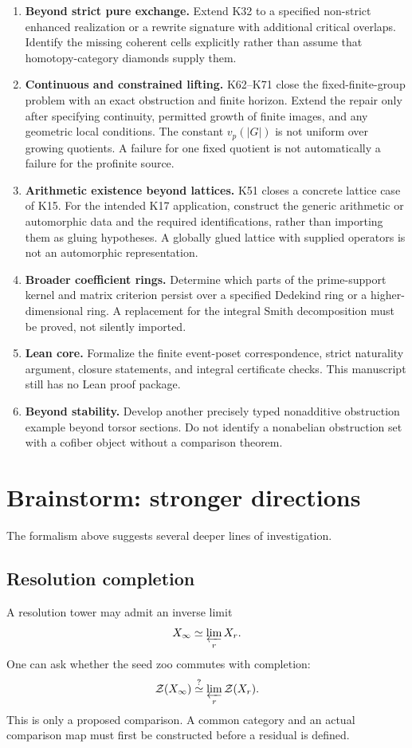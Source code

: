 \documentclass[11pt]{article}
\theoremstyle{definition}
\theoremstyle{remark}
\newcommand{\Zoo}{\mathcal Z}
\begin{document}
\begin{enumerate}
\item \textbf{Beyond strict pure exchange.} Extend K32 to a specified non-strict enhanced realization or a rewrite signature with additional critical overlaps. Identify the missing coherent cells explicitly rather than assume that homotopy-category diamonds supply them.
\item \textbf{Continuous and constrained lifting.} K62--K71 close the fixed-finite-group problem with an exact obstruction and finite horizon. Extend the repair only after specifying continuity, permitted growth of finite images, and any geometric local conditions. The constant $v_p(|G|)$ is not uniform over growing quotients. A failure for one fixed quotient is not automatically a failure for the profinite source.
\item \textbf{Arithmetic existence beyond lattices.} K51 closes a concrete lattice case of K15. For the intended K17 application, construct the generic arithmetic or automorphic data and the required identifications, rather than importing them as gluing hypotheses. A globally glued lattice with supplied operators is not an automorphic representation.
\item \textbf{Broader coefficient rings.} Determine which parts of the prime-support kernel and matrix criterion persist over a specified Dedekind ring or a higher-dimensional ring. A replacement for the integral Smith decomposition must be proved, not silently imported.
\item \textbf{Lean core.} Formalize the finite event-poset correspondence, strict naturality argument, closure statements, and integral certificate checks. This manuscript still has no Lean proof package.
\item \textbf{Beyond stability.} Develop another precisely typed nonadditive obstruction example beyond torsor sections. Do not identify a nonabelian obstruction set with a cofiber object without a comparison theorem.
\end{enumerate}

\section{Brainstorm: stronger directions}

The formalism above suggests several deeper lines of investigation.

\subsection{Resolution completion}
A resolution tower may admit an inverse limit
\[
X_\infty\simeq\varprojlim_r X_r.
\]
One can ask whether the seed zoo commutes with completion:
\[
\Zoo(X_\infty)
\stackrel{?}{\simeq}
\varprojlim_r\Zoo(X_r).
\]
This is only a proposed comparison. A common category and an actual comparison map must first be constructed before a residual is defined.
\end{document}
